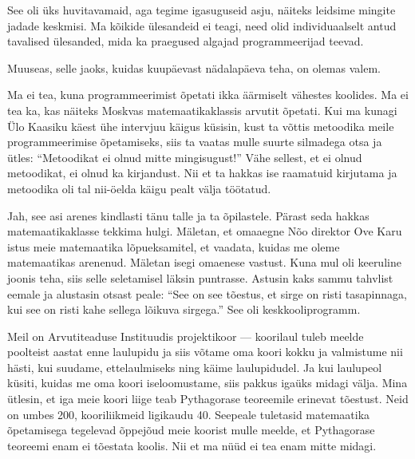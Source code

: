 
See oli üks huvitavamaid, aga tegime igasuguseid asju, näiteks leidsime mingite jadade keskmisi. Ma kõikide ülesandeid ei teagi, need olid individuaalselt antud tavalised ülesanded, mida ka praegused algajad 
programmeerijad teevad.

Muuseas, selle jaoks, kuidas kuupäevast nädalapäeva teha, on olemas valem. 


Ma ei tea, kuna programmeerimist õpetati ikka äärmiselt vähestes koolides. Ma ei 
tea ka, kas näiteks Moskvas matemaatikaklassis arvutit õpetati. Kui ma kunagi
Ülo Kaasiku käest ühe intervjuu käigus küsisin, 
kust ta võttis metoodika meile programmeerimise õpetamiseks, siis ta vaatas 
mulle suurte silmadega otsa ja ütles: \enquote{Metoodikat ei olnud mitte 
mingisugust!} Vähe sellest, et ei olnud metoodikat, ei olnud ka kirjandust. 
Nii et ta hakkas ise raamatuid kirjutama ja metoodika oli tal nii-öelda 
käigu pealt välja töötatud.


Jah, see asi arenes kindlasti tänu talle ja ta õpilastele. Pärast 
seda hakkas matemaatikaklasse tekkima hulgi. Mäletan, et omaaegne Nõo direktor Ove 
Karu istus meie matemaatika lõpueksamitel, et vaadata, kuidas me 
oleme matemaatikas arenenud. Mäletan isegi omaenese vastust. Kuna mul oli 
keeruline joonis teha, siis selle seletamisel läksin puntrasse. Astusin kaks 
sammu tahvlist eemale ja alustasin otsast peale: \enquote{See on see tõestus, et 
sirge on risti tasapinnaga, kui see on risti kahe sellega lõikuva sirgega.} See 
oli keskkooliprogramm. 

Meil on Arvutiteaduse Instituudis 
projektikoor --- koorilaul tuleb meelde poolteist aastat enne laulupidu ja siis 
võtame oma koori kokku ja valmistume nii hästi, kui suudame, ettelaulmiseks ning 
käime laulupidudel. Ja kui laulupeol küsiti, kuidas me oma koori 
iseloomustame, siis pakkus igaüks midagi välja. Mina ütlesin, et iga meie koori 
liige teab Pythagorase teoreemile erinevat tõestust. Neid on umbes 200, 
kooriliikmeid ligikaudu 40. Seepeale tuletasid matemaatika 
õpetamisega tegelevad õppejõud meie koorist mulle meelde, et 
Pythagorase teoreemi enam ei tõestata koolis. Nii et ma nüüd ei tea enam mitte 
midagi.

